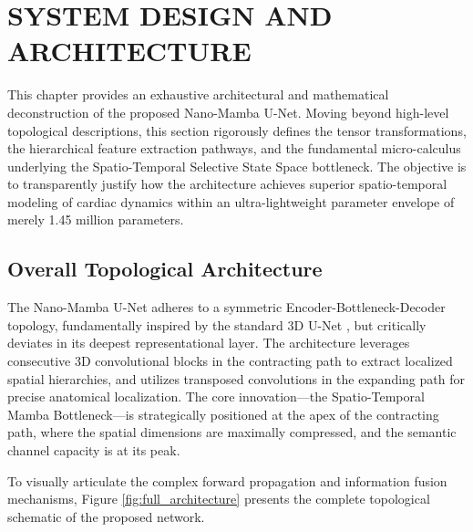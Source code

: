 \chapter{SYSTEM DESIGN AND ARCHITECTURE}
\label{chap:architecture}

This chapter provides an exhaustive architectural and mathematical deconstruction of the proposed Nano-Mamba U-Net. Moving beyond high-level topological descriptions, this section rigorously defines the tensor transformations, the hierarchical feature extraction pathways, and the fundamental micro-calculus underlying the Spatio-Temporal Selective State Space bottleneck. The objective is to transparently justify how the architecture achieves superior spatio-temporal modeling of cardiac dynamics within an ultra-lightweight parameter envelope of merely 1.45 million parameters.

\section{Overall Topological Architecture}
The Nano-Mamba U-Net adheres to a symmetric Encoder-Bottleneck-Decoder topology, fundamentally inspired by the standard 3D U-Net \cite{cicek20163d}, but critically deviates in its deepest representational layer. The architecture leverages consecutive 3D convolutional blocks in the contracting path to extract localized spatial hierarchies, and utilizes transposed convolutions in the expanding path for precise anatomical localization. The core innovation—the Spatio-Temporal Mamba Bottleneck—is strategically positioned at the apex of the contracting path, where the spatial dimensions are maximally compressed, and the semantic channel capacity is at its peak.

To visually articulate the complex forward propagation and information fusion mechanisms, Figure \ref{fig:full_architecture} presents the complete topological schematic of the proposed network.

